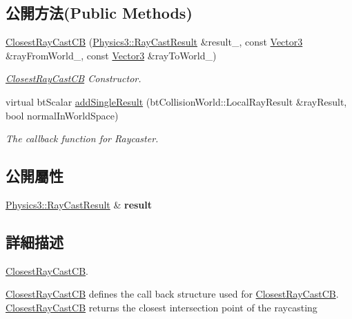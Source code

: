 \subsection*{公開方法(Public Methods)}
\begin{DoxyCompactItemize}
\item 
\hyperlink{struct_magnum_1_1_closest_ray_cast_c_b_a577ff033762eb586cdb05f34e8b00a51}{Closest\+Ray\+Cast\+CB} (\hyperlink{class_magnum_1_1_physics3_1_1_ray_cast_result}{Physics3\+::\+Ray\+Cast\+Result} \&result\+\_\+, const \hyperlink{class_magnum_1_1_vector3}{Vector3} \&ray\+From\+World\+\_\+, const \hyperlink{class_magnum_1_1_vector3}{Vector3} \&ray\+To\+World\+\_\+)
\begin{DoxyCompactList}\small\item\em \hyperlink{struct_magnum_1_1_closest_ray_cast_c_b}{Closest\+Ray\+Cast\+CB} Constructor. \end{DoxyCompactList}\item 
virtual bt\+Scalar \hyperlink{struct_magnum_1_1_closest_ray_cast_c_b_a060907e3976e9c75d15c852e4add18cc}{add\+Single\+Result} (bt\+Collision\+World\+::\+Local\+Ray\+Result \&ray\+Result, bool normal\+In\+World\+Space)
\begin{DoxyCompactList}\small\item\em The callback function for Raycaster. \end{DoxyCompactList}\end{DoxyCompactItemize}
\subsection*{公開屬性}
\begin{DoxyCompactItemize}
\item 
\hyperlink{class_magnum_1_1_physics3_1_1_ray_cast_result}{Physics3\+::\+Ray\+Cast\+Result} \& {\bfseries result}\hypertarget{struct_magnum_1_1_closest_ray_cast_c_b_ab8acee3ef201378d6476209573f107b5}{}\label{struct_magnum_1_1_closest_ray_cast_c_b_ab8acee3ef201378d6476209573f107b5}

\end{DoxyCompactItemize}


\subsection{詳細描述}
\hyperlink{struct_magnum_1_1_closest_ray_cast_c_b}{Closest\+Ray\+Cast\+CB}. 

\hyperlink{struct_magnum_1_1_closest_ray_cast_c_b}{Closest\+Ray\+Cast\+CB} defines the call back structure used for \hyperlink{struct_magnum_1_1_closest_ray_cast_c_b}{Closest\+Ray\+Cast\+CB}. \hyperlink{struct_magnum_1_1_closest_ray_cast_c_b}{Closest\+Ray\+Cast\+CB} returns the closest intersection point of the raycasting 

